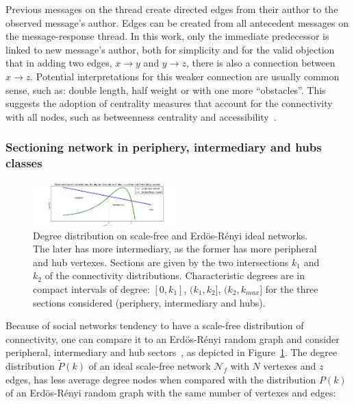 \documentclass[%
 aip,
 jmp,%
 amsmath,amssymb,
 reprint,%
]{revtex4-1}
\begin{document}
Previous messages on the thread create directed edges from their author to the observed message's author. Edges can be created from all antecedent messages on the message-response thread. In this work, only the immediate predecessor is linked to new message's author, both for simplicity and for the valid objection that in adding two edges, $x\rightarrow y$ and $y\rightarrow z$, there is also a connection between $x\rightarrow z$. Potential interpretations for this weaker connection are usually common sense, such as: double length, half weight or with one more ``obstacles''. This suggests the adoption of centrality measures that account for the connectivity with all nodes, such as betweenness centrality and accessibility~\cite{luMeasures,access}.


        \subsubsection{Sectioning network in periphery, intermediary and hubs classes}\label{sectioning}

\begin{figure}[hb]
    \centering
    \includegraphics[width=0.5\textwidth]{figs/fser}
    \caption{Degree distribution on scale-free and Erd\"os-R\'enyi ideal networks. The later has more
        intermediary, as the former has more peripheral and hub vertexes. Sections are
        given by the two intersections $k_1$ and $k_2$ of the connectivity distributions. Characteristic degrees
    are in compact intervals of degree: $[0,k_1]$, $(k_1,k_2]$, $(k_2,k_{max}]$ for the three sections considered (periphery, intermediary and hubs).}
    \label{fig:setores}
\end{figure}

Because of social networks tendency to have a scale-free distribution of connectivity,
one can compare it to an Erd\"os-R\'enyi random graph and consider peripheral, intermediary and hub
sectors~\cite{3setores}, as depicted in Figure~\ref{fig:setores}.
The degree distribution $\widetilde{P}(k)$ of an ideal
scale-free network $\mathcal{N}_f$ with $N$ vertexes and $z$ edges, has less
average degree nodes when compared with the distribution $P(k)$ of an Erd\"os-R\'enyi
random graph with the same number of vertexes and edges:
\end{document}
